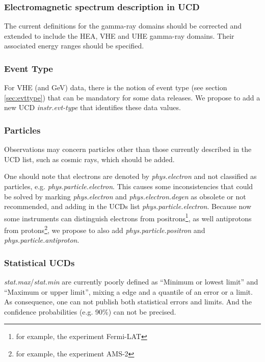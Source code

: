 \documentclass[11pt,a4paper]{ivoa}
\begin{document}
\subsubsection{Electromagnetic spectrum description in UCD}

The current definitions for the gamma-ray domains should be corrected and extended to include the \gls{HEA}, \gls{VHE} and \gls{UHE} gamma-ray domains. Their associated energy ranges should be specified.

\subsubsection{Event Type}

For \gls{VHE} (and GeV) data, there is the notion of event type (see section \ref{sec:evttype}) that can be mandatory for some data releases.  We propose to add a new UCD {\em instr.evt-type\/} that identifies these data values.

\subsubsection{Particles}

Observations may concern particles other than those currently described in the UCD list, such as cosmic rays, which should be added.

One should note that electrons are denoted by {\em phys.electron\/} and not classified as particles, e.g. {\em phys.particle.electron\/}. This causes some inconsistencies that could be solved by marking {\em phys.electron\/} and {\em phys.electron.degen\/} as obsolete or not recommended, and adding in the UCDs list {\em phys.particle.electron\/}. Because now some instruments can distinguish electrons from positrons\footnote{for example, the experiment Fermi-LAT}, as well antiprotons from protons\footnote{for example, the experiment AMS-2}, we propose to also add {\em phys.particle.positron\/} and {\em phys.particle.antiproton\/}.

\subsubsection{Statistical UCDs}

{\em stat.max}/{\em stat.min} are currently poorly defined as ``Minimum or lowest limit'' and ``Maximum or upper limit'', mixing a edge and a quantile of an error or a limit. As consequence, one can not publish both statistical errors and limits. And the confidence probabilities (e.g. 90\%) can not be precised.
\end{document}

